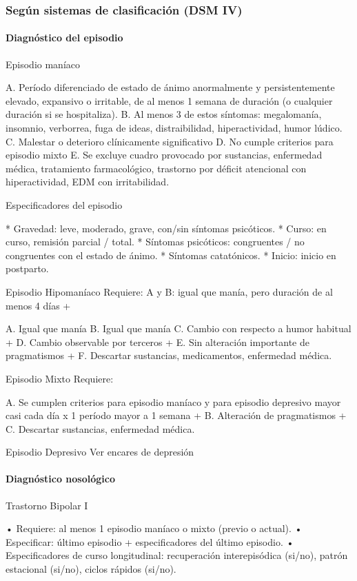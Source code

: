 \documentclass{scrbook}
\begin{document}
\subsubsection*{Según sistemas de clasificación (DSM IV)}
\paragraph{Diagnóstico del episodio}
Episodio maníaco

A. Período diferenciado de estado de ánimo anormalmente y persistentemente elevado, expansivo o irritable, de al menos 1 semana de duración (o cualquier duración si se hospitaliza).
B. Al menos 3 de estos síntomas: megalomanía, insomnio, verborrea, fuga de ideas, distraibilidad, hiperactividad, humor lúdico.
C. Malestar o deterioro clínicamente significativo
D. No cumple criterios para episodio mixto
E. Se excluye cuadro provocado por sustancias, enfermedad médica, tratamiento farmacológico, trastorno por déficit atencional con hiperactividad, EDM con irritabilidad.

Especificadores del episodio

* Gravedad: leve, moderado, grave, con/sin síntomas psicóticos.
* Curso: en curso, remisión parcial / total.
* Síntomas psicóticos: congruentes / no congruentes con el estado de ánimo.
* Síntomas catatónicos.
* Inicio: inicio en postparto.

Episodio Hipomaníaco Requiere: A y B: igual que manía, pero duración de al menos 4 días +

A. Igual que manía
B. Igual que manía
C. Cambio con respecto a humor habitual +
D. Cambio observable por terceros +
E. Sin alteración importante de pragmatismos +
F. Descartar sustancias, medicamentos, enfermedad médica.

Episodio Mixto Requiere:

A. Se cumplen criterios para episodio maníaco y para episodio depresivo mayor casi cada día x 1 período mayor a 1 semana +
B. Alteración de pragmatismos +
C. Descartar sustancias, enfermedad médica.

Episodio Depresivo Ver encares de depresión

\paragraph{Diagnóstico nosológico}

Trastorno Bipolar I

• Requiere: al menos 1 episodio maníaco o mixto (previo o actual).
• Especificar: último episodio + especificadores del último episodio.
• Especificadores de curso longitudinal: recuperación interepisódica (si/no), patrón estacional (si/no), ciclos rápidos (si/no).
\end{document}
